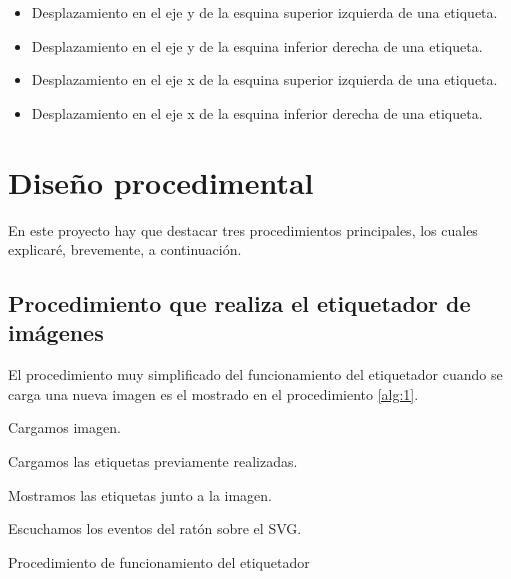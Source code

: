 \begin{itemize}
	\item Desplazamiento en el eje y de la esquina superior izquierda de una etiqueta.
	\item  Desplazamiento en el eje y de la esquina inferior derecha de una etiqueta.
	\item Desplazamiento en el eje x de la esquina superior izquierda de una etiqueta.
	\item  Desplazamiento en el eje x de la esquina inferior derecha de una etiqueta.
\end{itemize}

\section{Diseño procedimental}

En este proyecto hay que destacar tres procedimientos principales, los cuales explicaré, brevemente, a continuación.

\subsection{Procedimiento que realiza el etiquetador de imágenes}

El procedimiento muy simplificado del funcionamiento del etiquetador cuando se carga una nueva imagen es el mostrado en el procedimiento \ref{alg:1}.

\begin{algorithm}
    	{
    	Cargamos imagen.
    	
    		{
    			Cargamos las etiquetas previamente realizadas.
    			
    			Mostramos las etiquetas junto a la imagen.
    		}
    	Escuchamos los eventos del ratón sobre el SVG.
    	}
    \caption{Procedimiento de funcionamiento del etiquetador}
    \label{alg:1}
\end{algorithm}

